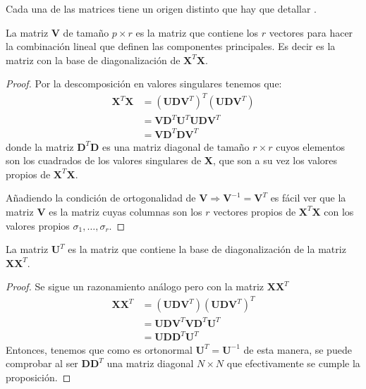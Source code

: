 \noindent Cada una de las matrices tiene un origen distinto que hay que detallar \cite{Johnson 1963}.

\begin{propo}
La matriz $\mathbf{V}$ de tamaño $p\times r$ es la matriz que contiene los $r$ vectores para hacer la combinación lineal que definen las componentes principales. Es decir es la matriz con la base de diagonalización de $\mathbf{X}^T\mathbf{X}$.
\begin{proof}
Por la descomposición en valores singulares tenemos que:
\begin{align*}
\textbf{X}^T \textbf{X} &= (\textbf{U}\mathbf{D} \textbf{V}^T)^T (\textbf{U}\mathbf{D} \textbf{V}^T)\\
&= \textbf{V}\mathbf{D} ^T \textbf{U}^T \textbf{U}\mathbf{D} \textbf{V}^T\\
&= \textbf{V}\mathbf{D} ^T \mathbf{D} \textbf{V}^T
\end{align*}
donde la matriz $\mathbf{D} ^T \mathbf{D} $ es una matriz diagonal de tamaño $r \times r$ cuyos elementos son los cuadrados de los valores singulares de \textbf{X}, que son a su vez los valores propios de $\textbf{X}^T \textbf{X}$. 

\noindent Añadiendo la condición de ortogonalidad de $\textbf{V}\Rightarrow \textbf{V}^{-1}=\mathbf{V}^T$ es fácil ver que la matriz \textbf{V} es la matriz cuyas columnas son los $r$ vectores propios de $\textbf{X}^T\textbf{X}$ con los valores propios $\sigma_1,\ldots, \sigma_r$.
\end{proof}
\end{propo}

\begin{propo}
La matriz $\mathbf{U}^T$ es la matriz que contiene la base de diagonalización de la matriz $\mathbf{XX}^T$.  
\begin{proof}
Se sigue un razonamiento análogo pero con la matriz $\mathbf{XX}^T$
\begin{align*}
\textbf{X} \textbf{X}^T  &= (\textbf{U}\mathbf{D} \textbf{V}^T)(\textbf{U}\mathbf{D} \textbf{V}^T)^T\\
&= \mathbf{UDV}^T\mathbf{VD}^T\mathbf{U}^T\\
&= \mathbf{UDD}^T\mathbf{U}^T
\end{align*}
Entonces, tenemos que como es ortonormal $\mathbf{U}^T=\mathbf{U}^{-1}$ de esta manera, se puede comprobar al ser $\mathbf{DD}^T$ una matriz diagonal $N\times N$ que efectivamente se cumple la proposición.\qedhere
\end{proof}
\end{propo}

